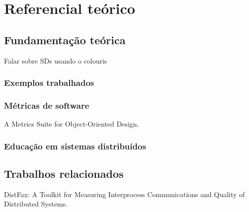 \chapter{Referencial teórico}
\label{cap:referencialTeorico}


\section{Fundamentação teórica}
\label{section:background}
Falar sobre SDs usando o colouris


\subsection{Exemplos trabalhados}


\subsection{Métricas de software}

A Metrics Suite for Object-Oriented Design.


\subsection{Educação em sistemas distribuídos}



\section{Trabalhos relacionados}
\label{section:related-work}

DistFax: A Toolkit for Measuring Interprocess Communications and Quality of Distributed Systems.
    

